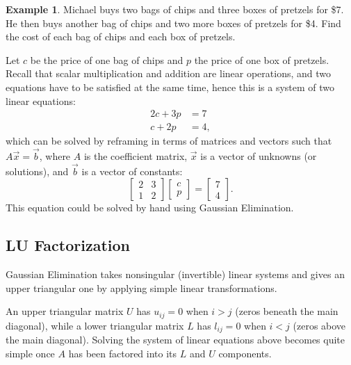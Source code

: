 \documentclass[12pt,letterpaper,DIV=11]{scrartcl}
\theoremstyle{plain}
\theoremstyle{definition}
\newtheorem{example}{Example}[section]
\theoremstyle{remark}
\begin{document}
\begin{example}
  Michael buys two bags of chips and three boxes of pretzels for \$7.
  He then buys another bag of chips and two more boxes of pretzels for \$4.
  Find the cost of each bag of chips and each box of pretzels.

  Let $c$ be the price of one bag of chips and $p$ the price of one box of pretzels.
  Recall that scalar multiplication and addition are linear operations, and two equations have to be satisfied at the same time, hence this is a system of two linear equations: \begin{align*}
    2c + 3p &= 7 \\
    c + 2p &= 4,
  \end{align*} which can be solved by reframing in terms of matrices and vectors such that $A \vec{x} = \vec{b}$, where $A$ is the coefficient matrix, $\vec{x}$ is a vector of unknowns (or solutions), and $\vec{b}$ is a vector of constants:
  \begin{displaymath}
    \begin{bmatrix}
      2 & 3 \\
      1 & 2
    \end{bmatrix}
    \begin{bmatrix}
      c \\
      p
    \end{bmatrix} =
    \begin{bmatrix}
      7 \\
      4
    \end{bmatrix}.
  \end{displaymath}
  This equation could be solved by hand using Gaussian Elimination.
\end{example}

\subsection{LU Factorization}
Gaussian Elimination takes nonsingular (invertible) linear systems and gives an upper triangular one by applying simple linear transformations.

An upper triangular matrix $U$ has $u_{ij} = 0$ when $i > j$ (zeros beneath the main diagonal), while a lower triangular matrix $L$ has $l_{ij} = 0$ when $i < j$ (zeros above the main diagonal).
Solving the system of linear equations above becomes quite simple once $A$ has been factored into its $L$ and $U$ components.
\end{document}
